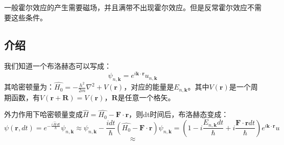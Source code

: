 \begin{issues}
\issueDraft
\end{issues}
一般霍尔效应的产生需要磁场，并且满带不出现霍尔效应。但是反常霍尔效应不需要这些条件。
\subsection{介绍}
我们知道一个布洛赫态可以写成：
\begin{equation}
\psi_{n,\boldsymbol{k}}=e^{i\boldsymbol{k}\cdot\boldsymbol{r}}u_{n,\boldsymbol{k}}
\end{equation}
其哈密顿量为：$\widehat{H_0}=-\frac{h^2}{2m}\nabla^2+V(\boldsymbol{r})$，对应的能量是$E_{n,\boldsymbol{k}}$。其中$V(\boldsymbol{r})$是一个周期函数，有$V(\boldsymbol{r}+\boldsymbol{R})=V(\boldsymbol{r})$，$\boldsymbol{R}$是任意一个格矢。

外力作用下哈密顿量变成$\widehat{H}=\widehat{H_0}-\boldsymbol{F}\cdot\boldsymbol{r}$，则dt时间后，布洛赫态变成：
\begin{equation}
\psi(\boldsymbol{r},dt)=e^{-\frac{i\,\widehat{H}\,dt}{\hbar}}\psi_{n,\boldsymbol{k}} \approx \psi_{n,\boldsymbol{k}}-\frac{idt}{\hbar}(\widehat{H_0}-\boldsymbol{F}\cdot\boldsymbol{r})\psi_{n,\boldsymbol{k}}
=(1-i\frac{E_{n,\boldsymbol{k}}dt}{\hbar}+i\frac{\boldsymbol{F}\cdot\boldsymbol{r}dt}{\hbar})e^{i\boldsymbol{k}\cdot\boldsymbol{r}}u_{}
\end{equation}
\begin{equation}
\approx
\end{equation}


